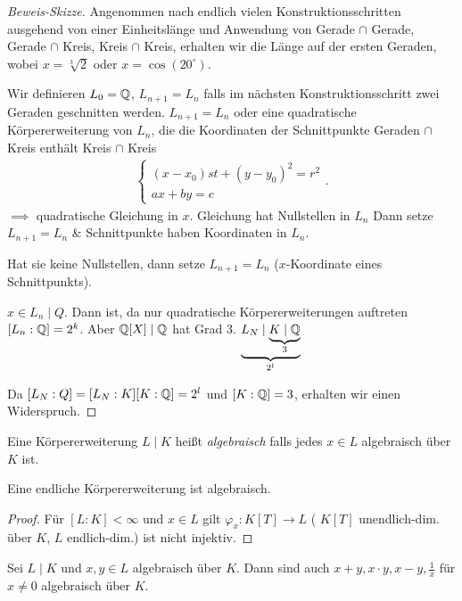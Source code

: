 \begin{proof}[Beweis-Skizze]
	Angenommen nach endlich vielen Konstruktionsschritten ausgehend von einer Einheitslänge und Anwendung von
	Gerade $\cap$ Gerade, Gerade $\cap $ Kreis, Kreis $\cap $ Kreis, erhalten wir die Länge auf der ersten Geraden, wobei $x = \sqrt[3]{2}$ oder $x = \cos(20^{\circ})$.

	Wir definieren $L_0 = \mathbb{Q}$, $L_{n+1} = L_{n}$ falls im nächsten Konstruktionsschritt zwei Geraden geschnitten werden.
	$L_{n+1} = L_{n}$ oder eine quadratische Körpererweiterung von $L_{n}$, die die Koordinaten der Schnittpunkte Geraden $\cap$ Kreis enthält Kreis $\cap$ Kreis
	\begin{align*}
		\begin{cases}
			(x-x_0)st + (y-y_0)^2 = r^2\\
			a x + b y = c
		\end{cases}
	.\end{align*}
	$\implies$ quadratische Gleichung in $x$. Gleichung hat Nullstellen in $L_{n}$ 
	Dann setze $L_{n+1} = L_{n}$ \& Schnittpunkte haben Koordinaten in $L_{n}$.

	Hat sie keine Nullstellen, dann setze $L_{n+1} = L_{n}$ ($x$-Koordinate eines Schnittpunkts).

	$x \in L_{n} \mid Q$. Dann ist, da nur quadratische Körpererweiterungen auftreten $[L_{n} : \mathbb{Q}] = 2^{k}$.
	Aber $\mathbb{Q}[X] \mid \mathbb{Q}$ hat Grad $3$. $\underbrace{L_{N} \mid \underbrace{K \mid \mathbb{Q}}_{3}}_{2^{l}}$

	Da $[L_{N} : Q] = [L_{N} : K] [K : \mathbb{Q}] = 2^{l}$ und $[K:\mathbb{Q}] = 3$, erhalten wir einen Widerspruch.
\end{proof}

\begin{definition}
	Eine Körpererweiterung $L \mid K$ heißt \emph{algebraisch} falls jedes $x \in L$ algebraisch über $K$ ist.
\end{definition}

\begin{lemma}
	Eine endliche Körpererweiterung ist algebraisch.
\end{lemma}

\begin{proof}
	Für $[L:K] < \infty$ und $x \in L$ gilt $\varphi_{x}: K[T] \to L$ ( $K[T]$ unendlich-dim. über $K$, $L$ endlich-dim.) ist nicht injektiv.
\end{proof}

\begin{corollary}
	Sei $L \mid K$ und $x,y \in L$ algebraisch über $K$. Dann sind auch $x+y, x\cdot y, x-y, \frac{1}{x}$ für $x\neq 0$ algebraisch über $K$.
\end{corollary}

